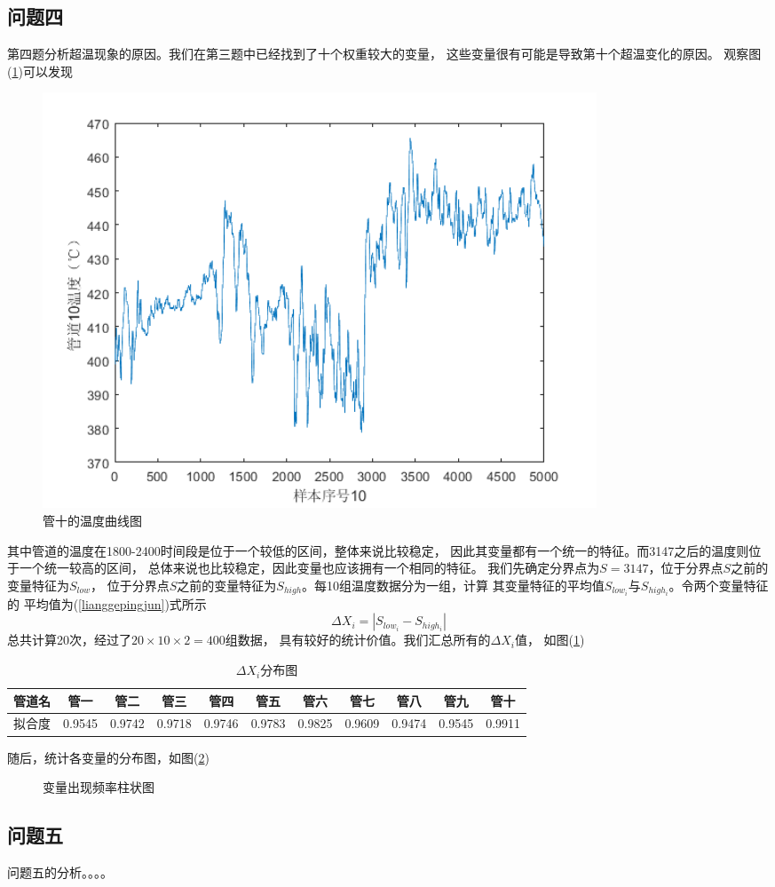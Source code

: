     \subsection{问题四}
        第四题分析超温现象的原因。我们在第三题中已经找到了十个权重较大的变量，
        这些变量很有可能是导致第十个超温变化的原因。
        观察图(\ref{wendushi})可以发现
        \begin{figure}
            \centering
            \includegraphics[width=0.8\textwidth]{figures/p1_10.png}
            \caption{管十的温度曲线图}
            \label{wendushi}
        \end{figure}
        其中管道的温度在1800-2400时间段是位于一个较低的区间，整体来说比较稳定，
        因此其变量都有一个统一的特征。而3147之后的温度则位于一个统一较高的区间，
        总体来说也比较稳定，因此变量也应该拥有一个相同的特征。
        我们先确定分界点为$S=3147$，位于分界点$S$之前的变量特征为$S_{low}$，
        位于分界点$S$之前的变量特征为$S_{high}$。每10组温度数据分为一组，计算
        其变量特征的平均值$S_{low_i}$与$S_{high_i}$。令两个变量特征的
        平均值为(\ref{lianggepingjun})式所示
        \begin{equation}
            \Delta X_i = |S_{low_i} - S_{high_i}|
            \label{lianggepingjun}
        \end{equation}
        总共计算20次，经过了$20\times 10 \times 2 = 400$组数据，
        具有较好的统计价值。我们汇总所有的$\Delta X_i$值，
        如图(\ref{delta_x_distribution})
        \begin{table}
            \centering
            \begin{tabular}{|c|c|c|c|c|c|c|c|c|c|c|}
                \hline
                管道名&管一&管二&管三&管四&管五&管六&管七&管八&管九&管十\\
                \hline
                拟合度&0.9545&0.9742&0.9718&0.9746&0.9783&0.9825&0.9609&0.9474&0.9545&0.9911\\
                \hline
            \end{tabular}
            \caption{$\Delta X_i$分布图}
            \label{delta_x_distribution}
        \end{table}
        随后，统计各变量的分布图，如图(\ref{4_variable_frequency})
        \begin{figure}

            \label{4_variable_frequency}
            \caption{变量出现频率柱状图}
        \end{figure}

    \subsection{问题五}
        问题五的分析。。。。    